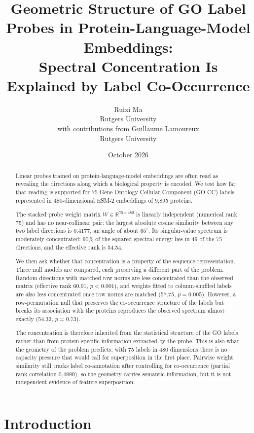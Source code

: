 \documentclass[11pt,a4paper]{article}
\title{Geometric Structure of GO Label Probes in Protein-Language-Model
Embeddings:\\
Spectral Concentration Is Explained by Label Co-Occurrence}
\author{
    Ruixi Ma\\
    Rutgers University
    \\[1.0em]
    \normalsize with contributions from Guillaume Lamoureux\\
    \normalsize Rutgers University
}
\date{October 2026}
\begin{document}
\maketitle

\begin{abstract}
Linear probes trained on protein-language-model embeddings are often read as
revealing the directions along which a biological property is encoded. We test how
far that reading is supported for 75 Gene Ontology Cellular Component (GO CC)
labels represented in 480-dimensional ESM-2 embeddings of 9{,}895 proteins.

The stacked probe weight matrix $W \in \mathbb{R}^{75 \times 480}$ is linearly
independent (numerical rank 75) and has no near-collinear pair: the largest
absolute cosine similarity between any two label directions is $0.4177$, an angle
of about $65^\circ$. Its singular-value spectrum is moderately concentrated: 90\%
of the squared spectral energy lies in 49 of the 75 directions, and the effective
rank is 54.54.

We then ask whether that concentration is a property of the sequence
representation. Three null models are compared, each preserving a different part of
the problem. Random directions with matched row norms are less concentrated than
the observed matrix (effective rank 60.91, $p < 0.001$), and weights fitted to
column-shuffled labels are also less concentrated once row norms are matched (57.75,
$p = 0.005$). However, a row-permutation null that preserves the co-occurrence
structure of the labels but breaks its association with the proteins reproduces the
observed spectrum almost exactly (54.32, $p = 0.73$).

The concentration is therefore inherited from the statistical structure of the GO
labels rather than from protein-specific information extracted by the probe. This
is also what the geometry of the problem predicts: with 75 labels in 480
dimensions there is no capacity pressure that would call for superposition in the
first place. Pairwise weight similarity still tracks label co-annotation after
controlling for co-occurrence (partial rank correlation 0.4889), so the geometry
carries semantic information, but it is not independent evidence of feature
superposition.
\end{abstract}

\section{Introduction}
\end{document}

